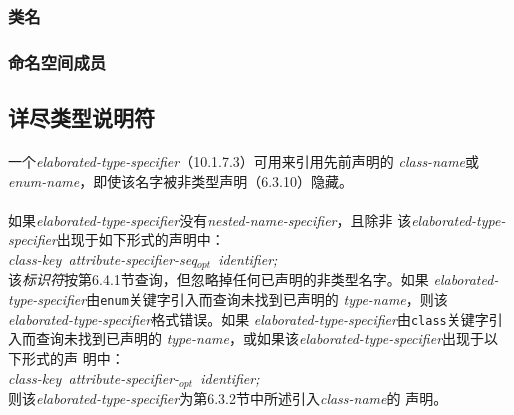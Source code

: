 \subsubsection{类名}
\subsubsection{命名空间成员}

\subsection{详尽类型说明符}
\paragraph{}
一个\textit{elaborated-type-specifier}（10.1.7.3）可用来引用先前声明的
\textit{class-name}或\textit{enum-name}，即使该名字被非类型声明（6.3.10）隐藏。

\paragraph{}
如果\textit{elaborated-type-specifier}没有\textit{nested-name-specifier}，且除非
该\textit{elaborated-type-specifier}出现于如下形式的声明中：\\
\mbox{\qquad \textit{class-key attribute-specifier-seq$_{opt}$ identifier;}} \\
该\textit{标识符}按第6.4.1节查询，但忽略掉任何已声明的非类型名字。如果
\textit{elaborated-type-specifier}由\texttt{enum}关键字引入而查询未找到已声明的
\textit{type-name}，则该\textit{elaborated-type-specifier}格式错误。如果
\textit{elaborated-type-specifier}由\texttt{class}关键字引入而查询未找到已声明的
\textit{type-name}，或如果该\textit{elaborated-type-specifier}出现于以下形式的声
明中： \\
\mbox{\qquad \textit{class-key attribute-specifier-$_{opt}$ identifier;}} \\
则该\textit{elaborated-type-specifier}为第6.3.2节中所述引入\textit{class-name}的
声明。

